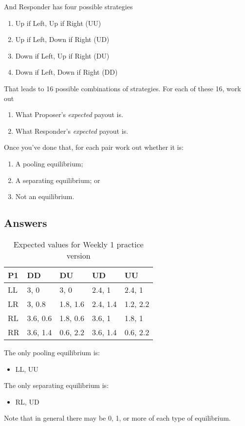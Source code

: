 \documentclass[
  12pt,
  letterpaper,
  DIV=11,
  numbers=noendperiod]{scrartcl}
\providecommand{\tightlist}{%
  \setlength{\itemsep}{0pt}\setlength{\parskip}{0pt}}\usepackage{longtable,booktabs,array}
\begin{document}
And Responder has four possible strategies

\begin{enumerate}
\def\labelenumi{\arabic{enumi}.}
\tightlist
\item
  Up if Left, Up if Right (UU)
\item
  Up if Left, Down if Right (UD)
\item
  Down if Left, Up if Right (DU)
\item
  Down if Left, Down if Right (DD)
\end{enumerate}

That leads to 16 possible combinations of strategies. For each of these
16, work out

\begin{enumerate}
\def\labelenumi{\Alph{enumi}.}
\tightlist
\item
  What Proposer's \emph{expected} payout is.
\item
  What Responder's \emph{expected} payout is.
\end{enumerate}

Once you've done that, for each pair work out whether it is:

\begin{enumerate}
\def\labelenumi{\Alph{enumi}.}
\tightlist
\item
  A pooling equilibrium;
\item
  A separating equilibrium; or
\item
  Not an equilibrium.
\end{enumerate}

\subsection{Answers}\label{answers}

\begin{longtable}[]{@{}lllll@{}}

\caption{\label{tbl-main-tree}Expected values for Weekly 1 practice
version}

\tabularnewline

\toprule\noalign{}
P1 & DD & DU & UD & UU \\
\midrule\noalign{}
\endhead
\bottomrule\noalign{}
\endlastfoot
LL & 3, 0 & 3, 0 & 2.4, 1 & 2.4, 1 \\
LR & 3, 0.8 & 1.8, 1.6 & 2.4, 1.4 & 1.2, 2.2 \\
RL & 3.6, 0.6 & 1.8, 0.6 & 3.6, 1 & 1.8, 1 \\
RR & 3.6, 1.4 & 0.6, 2.2 & 3.6, 1.4 & 0.6, 2.2 \\

\end{longtable}

The only pooling equilibrium is:

\begin{itemize}
\tightlist
\item
  LL, UU
\end{itemize}

The only separating equilibrium is:

\begin{itemize}
\tightlist
\item
  RL, UD
\end{itemize}

Note that in general there may be 0, 1, or more of each type of
equilibrium.
\end{document}
